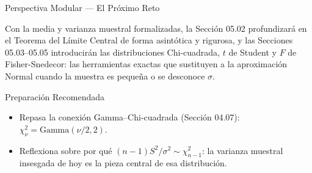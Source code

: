 \documentclass[10pt, aspectratio=169]{beamer}
\begin{document}
\begin{frame}{Perspectiva Modular --- El Próximo Reto}
  \scriptsize
  \begin{retoclase}
    Con la media y varianza muestral formalizadas, la Sección 05.02 profundizará en el Teorema del Límite Central de forma asintótica y rigurosa, y las Secciones 05.03--05.05 introducirán las distribuciones Chi-cuadrada, $t$ de Student y $F$ de Fisher-Snedecor: las herramientas exactas que sustituyen a la aproximación Normal cuando la muestra es pequeña o se desconoce $\sigma$.
  \end{retoclase}

  \vspace{0.08cm}
  \pause
  \begin{alertblock}{Preparación Recomendada}
    \begin{itemize}\itemsep=0.06cm
      \item Repasa la conexión Gamma--Chi-cuadrada (Sección 04.07): $\chi^2_\nu = \text{Gamma}(\nu/2, 2)$.
      \item Reflexiona sobre por qué $(n-1)S^2/\sigma^2 \sim \chi^2_{n-1}$: la varianza muestral insesgada de hoy es la pieza central de esa distribución.
    \end{itemize}
  \end{alertblock}
\end{frame}
\end{document}
